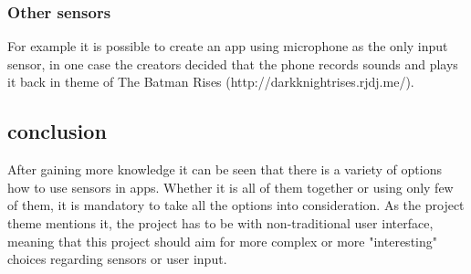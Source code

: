 \subsubsection*{Other sensors}
For example it is possible to create an app using microphone as the only input sensor, in one case the creators decided that the phone records sounds and plays it back in theme of The Batman Rises (http://darkknightrises.rjdj.me/).
\subsection{conclusion}
After gaining more knowledge it can be seen that there is a variety of options how to use sensors in apps. Whether it is all of them together or using only few of them, it is mandatory to take all the options into consideration. As the project theme mentions it, the project has to be with non-traditional user interface, meaning that this project should aim for more complex or more "interesting" choices regarding sensors or user input.
